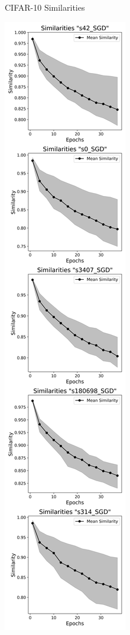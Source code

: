 \begin{figure}[h!]
\begin{subfigure}[b]{0.3\textwidth}
        \caption{CIFAR-10 Similarities}
        \label{fig:cifar10_sgd}
      \end{subfigure}
      \hfill %
      \begin{subfigure}[b]{0.3\textwidth}
        \includegraphics[width=\textwidth]{figures/mammo_similarities_SGD_V2.png}

\end{subfigure}
\end{figure}
